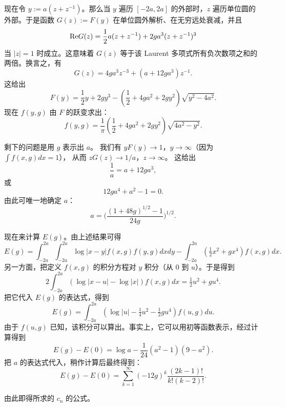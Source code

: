 现在令 $y:=a(z+z^{-1})$。那么当 $y$ 遍历 $[-2a,2a]$ 的外部时，$z$ 遍历单位圆的外部。于是函数 $G(z):=F(y)$ 在单位圆外解析、在无穷远处衰减，并且
$$
{\rm Re}G(z)=\frac{1}{2}a(z+z^{-1})+2ga^3(z+z^{-1})^3
$$ 
当 $|z|=1$ 时成立。这意味着 $G(z)$ 等于该 Laurent 多项式所有负次数项之和的两倍。换言之，有
$$
G(z)=4ga^3z^{-3}+(a+12ga^3)z^{-1}.
$$
这给出
$$
F(y)=\frac{1}{2}y+2gy^3
-\left(\frac{1}{2}+4ga^2+2gy^2\right)\sqrt{y^2-4a^2}.
$$
现在 $f(y,g)$ 由 $F$ 的跃变求出：
$$
f(y,g)=\frac{1}{\pi}\left(\frac{1}{2}+4ga^2+2gy^2\right)\sqrt{4a^2-y^2}.
$$

剩下的问题是用 $g$ 表示出 $a$。
我们有 $yF(y)\to 1$，$y\to \infty$（因为 $\int f(x,g)dx=1$），
从而 $zG(z)\to 1/a$，$z\to \infty$。
这给出
$$
\frac{1}{a}=a+12ga^3,
$$ 
或
$$
12ga^4+a^2-1=0.
$$
由此可唯一地确定 $a$：
$$
a=\biggl(\frac{(1+48g)^{1/2}-1}{24g}\biggr)^{1/2}.
$$

现在来计算 $E(g)$。由上述结果可得
$$
E(g)=\int_{-2a}^{2a}\int_{-2a}^{2a}\log|x-y|f(x,g)f(y,g)dxdy-
\int_{-2a}^{2a}(\tfrac{1}{2}x^2+gx^4)f(x,g)dx.
$$
另一方面，把定义 $f(x,g)$ 的积分方程对 $y$ 积分（从 $0$ 到 $u$）。于是得到
$$
2\int_{-2a}^{2a}(\log|x-u|-\log|x|)f(x,g)dx=\tfrac{1}{2}u^2+gu^4.
$$
把它代入 $E(g)$ 的表达式，得到
$$
E(g)=\int_{-2a}^{2a}(\log|u|-\tfrac{1}{4}u^2-\tfrac{1}{2}gu^4)f(u,g)du.
$$
由于 $f(u,g)$ 已知，该积分可以算出。事实上，它可以用初等函数表示，经过计算得到
$$
E(g)-E(0)=\log a-\frac{1}{24}(a^2-1)(9-a^2).
$$
把 $a$ 的表达式代入，稍作计算后最终得到：
$$
E(g)-E(0)=\sum_{k=1}^\infty (-12g)^k\frac{(2k-1)!}{k!(k-2)!}.
$$

由此即得所求的 $c_n$ 的公式。

